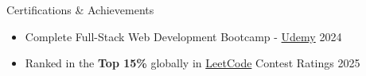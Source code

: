 \documentclass{resume} %
\begin{document}
\begin{rSection}{Certifications \& Achievements} 
\begin{itemize}
    \item {Complete Full-Stack Web Development Bootcamp - {\href{https://ude.my/UC-dca1983a-acc6-416a-9f93-c322377229b5}{Udemy}} \hfill 2024} 

   
    \item {Ranked in the {\bf Top 15\%} globally in {\href{https://leetcode.com/u/donquixote-doflamingo/}{LeetCode}} Contest Ratings \hfill 2025}
\end{itemize}

\end{rSection}    
\end{document}
